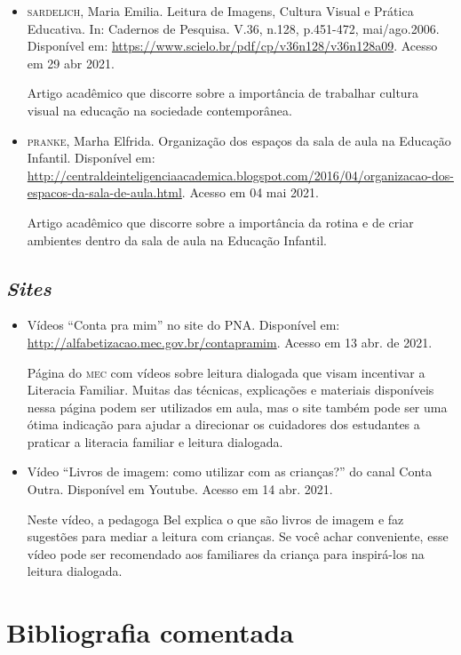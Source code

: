 \documentclass[11pt]{extarticle}
\begin{document}
\begin{itemize}
\item \textsc{sardelich}, Maria Emilia. Leitura de Imagens, Cultura Visual e Prática Educativa. 
In: Cadernos de Pesquisa. V.36, n.128, p.451-472, mai/ago.2006. Disponível em: \url{https://www.scielo.br/pdf/cp/v36n128/v36n128a09}. 
Acesso em 29 abr 2021. 

Artigo acadêmico que discorre sobre a importância de trabalhar cultura 
visual na educação na sociedade contemporânea. 

\item \textsc{pranke}, Marha Elfrida. Organização dos espaços da sala de aula na Educação Infantil. Disponível em: \url{http://centraldeinteligenciaacademica.blogspot.com/2016/04/organizacao-dos-espacos-da-sala-de-aula.html}. Acesso em 04 mai 2021. 

Artigo acadêmico que discorre sobre a importância da rotina e de criar ambientes dentro da sala de aula na Educação Infantil.  
\end{itemize}

\subsection{\textit{Sites}}

\begin{itemize}
\item Vídeos “Conta pra mim” no site do PNA. Disponível em: \url{http://alfabetizacao.mec.gov.br/contapramim}. 
Acesso em 13 abr. de 2021.

Página do \textsc{mec} com vídeos sobre leitura dialogada que visam incentivar a Literacia Familiar. Muitas das 
técnicas, explicações e materiais disponíveis nessa página podem ser utilizados em aula, mas o site também 
pode ser uma ótima indicação para ajudar a direcionar os cuidadores dos estudantes a praticar 
a literacia familiar e leitura dialogada.

\item Vídeo “Livros de imagem: como utilizar com as crianças?” do canal Conta Outra. Disponível em Youtube. 
Acesso em 14 abr. 2021. 

Neste vídeo, a pedagoga Bel explica o que são livros de imagem e faz sugestões para mediar a leitura com 
crianças. Se você achar conveniente, esse vídeo pode ser recomendado aos familiares da criança 
para inspirá-los na leitura dialogada. 
\end{itemize}

\section{Bibliografia comentada}
\end{document}
